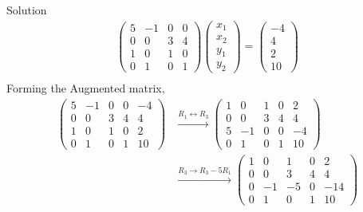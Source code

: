 \documentclass{beamer}
\numberwithin{equation}{section}
\theoremstyle{remark}
\newcommand{\myvec}[1]{\ensuremath{\begin{pmatrix}#1\end{pmatrix}}}
\begin{document}
\begin{frame}{Solution}
    \begin{align}
    \begin{pmatrix}
        5 & -1 & 0 & 0\\
        0 & 0 & 3 & 4\\
        1 & 0 & 1 & 0\\
        0 & 1 & 0 & 1
    \end{pmatrix} \myvec{x_1\\x_2\\y_1\\y_2}=\myvec{-4\\4\\2\\10}\\
\end{align}
Forming the Augmented matrix,
\begin{align}
\left(\begin{array}{cccc|c}
        5 & -1 & 0 & 0 & -4\\
        0 & 0 & 3 & 4 & 4\\
        1 & 0 & 1 & 0 & 2\\
        0 & 1 & 0 & 1 & 10
\end{array}\right) &\xrightarrow{R_1 \leftrightarrow R_3} \left(\begin{array}{cccc|c}
        1 & 0 & 1 & 0 & 2\\
        0 & 0 & 3 & 4 & 4\\
        5 & -1 & 0 & 0 & -4\\
        0 & 1 & 0 & 1 & 10
\end{array}\right)\\
 &\xrightarrow{R_3 \rightarrow R_3-5R_1} \left(\begin{array}{cccc|c}
        1 & 0 & 1 & 0 & 2\\
        0 & 0 & 3 & 4 & 4\\
        0 & -1 & -5 & 0 & -14\\
        0 & 1 & 0 & 1 & 10
\end{array}\right)\\
\end{align}
\end{frame}
\end{document}
